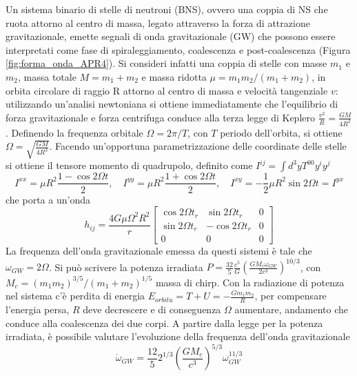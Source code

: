 Un sistema binario di stelle di neutroni (BNS), ovvero una coppia di NS che ruota attorno al centro di massa, legato attraverso la forza di attrazione gravitazionale, emette segnali di onda gravitazionale (GW) che possono essere interpretati come fase di spiraleggiamento, coalescenza e post-coalescenza (Figura \ref{fig:forma_onda_APR4}). Si consideri infatti una coppia di stelle con masse $m_1$ e $m_2$, massa totale $M = m_1 + m_2$ e massa ridotta $\mu = m_1m_2/(m_1+m_2)$, in orbita circolare di raggio R attorno al centro di massa e velocità tangenziale $v$: utilizzando un'analisi newtoniana si ottiene immediatamente che l'equilibrio di forza gravitazionale e forza centrifuga conduce alla terza legge di Keplero $\frac{v^2}{R} = \frac{GM}{4R^2}$. Definendo la frequenza orbitale $\Omega=2\pi/T$, con $T$ periodo dell'orbita, si ottiene	$\Omega=\sqrt{\frac{GM}{4R^3}}$. Facendo un'opportuna parametrizzazione delle coordinate delle stelle si ottiene il tensore momento di quadrupolo, definito come $I^{ij} = \int d^3yT^{00}y^iy^j$
\begin{equation}
	I^{xx} = \mu R^2\frac{1-\cos{2\Omega t}}{2}, \quad I^{yy} = \mu R^2\frac{1+\cos{2\Omega t}}{2}, \quad I^{xy}  = -\frac{1}{2}\mu R^2\sin{2\Omega t}= I^{yx}
	\label{eqn:quadrupole_moment}
\end{equation}
che porta a un'onda
\begin{equation}
	h_{ij} = \frac{4G\mu\Omega^2R^2}{r}
	\begin{bmatrix}
	\cos{2\Omega t_r}	&\sin{2\Omega t_r}	&0\\
	\sin{2\Omega t_r}	&-\cos{2\Omega t_r}	&0\\
	0					&0					&0
	\end{bmatrix}
	\label{eqn:wave_form}
\end{equation}
La frequenza dell'onda gravitazionale emessa da questi sistemi è tale che $\omega_{GW} = 2\Omega$.
Si può scrivere la potenza irradiata $P=\frac{32}{5}\frac{c^5}{G}\left(\frac{GM_c\omega_{GW}}{2c^3}\right)^{10/3}$, con $M_c=\left(m_1m_2\right)^{3/5}/\left(m_1+m_2\right)^{1/5}$ massa di chirp. Con la radiazione di potenza nel sistema c'è perdita di energia $E_{orbita} = T + U = -\frac{Gm_1m_2}{R}$, per compensare l'energia persa, $R$ deve decrescere e di conseguenza $\Omega$ aumentare, andamento che conduce alla coalescenza dei due corpi.
A partire dalla legge per la potenza irradiata, è possibile valutare l'evoluzione della frequenza dell'onda gravitazionale 
\begin{equation}
	\dot{\omega}_{GW} = \frac{12}{5}2^{1/3}\left(\frac{GM_c}{c^3}\right)^{5/3}\omega_{GW}^{11/3}
	\label{eqn:gw_frequency_law}
\end{equation} 
